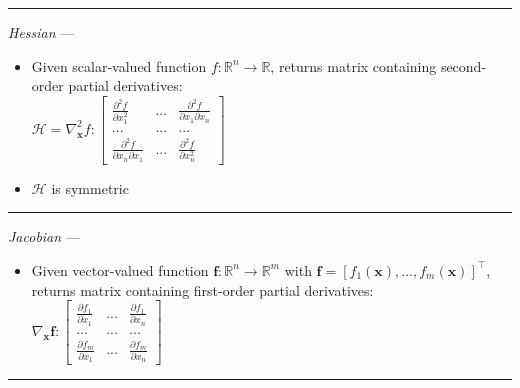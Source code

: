 {\color{lightgray}\hrule height 0.001mm}

\emph{Hessian} --- 
\begin{itemize}
    \item Given scalar-valued function $f: \mathbb{R}^{n} \rightarrow \mathbb{R}$, returns matrix containing second-order partial derivatives:\\
    $\mathcal{H} = \nabla_{\boldsymbol{x}}^2 f: \begin{bmatrix}
    \frac{\partial^2 f}{\partial x_1^2} & ... & \frac{\partial^2 f}{\partial x_1 \partial x_n} \\
    ... & ... & ... \\
    \frac{\partial^2 f}{\partial x_n \partial x_1} & ... & \frac{\partial^2 f}{\partial x_n^2}
    \end{bmatrix}$
    \item $\mathcal{H}$ is symmetric 
\end{itemize}

{\color{lightgray}\hrule height 0.001mm}

\emph{Jacobian} --- 
\begin{itemize}
    \item Given vector-valued function $\boldsymbol{f}: \mathbb{R}^{n} \rightarrow \mathbb{R}^{m}$ with $\boldsymbol{f} = [f_1(\boldsymbol{x}), ..., f_m(\boldsymbol{x})]^\intercal$, returns matrix containing first-order partial derivatives:\\
    $\nabla_{\boldsymbol{x}} \boldsymbol{f}: \begin{bmatrix}
    \frac{\partial f_1}{\partial x_1} & ... & \frac{\partial f_1}{\partial x_n} \\
    ... & ... & ... \\
    \frac{\partial f_m}{\partial x_1} & ... & \frac{\partial f_m}{\partial x_n}
    \end{bmatrix}$
\end{itemize}

{\color{lightgray}\hrule height 0.001mm}

